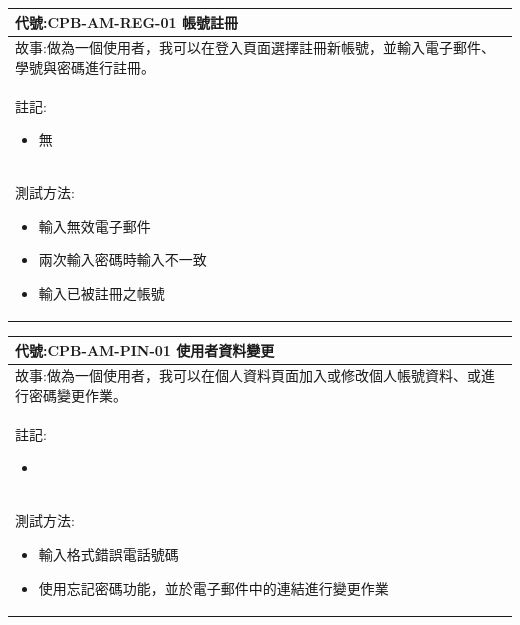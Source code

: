 \documentclass{article}
\begin{document}
\begin{table}[H]
	\begin{tabular}{| m{13cm} |}
		\hline
		代號:CPB-AM-REG-01	帳號註冊                         \\ \hline
		故事:做為一個使用者，我可以在登入頁面選擇註冊新帳號，並輸入電子郵件、學號與密碼進行註冊。 \\	\hline
		註記:
		\begin{itemize}
			\item 無
		\end{itemize}                                \\ \hline
		測試方法:
		\begin{itemize}
			\item 輸入無效電子郵件
			\item 兩次輸入密碼時輸入不一致
			\item 輸入已被註冊之帳號
		\end{itemize}
		\\	\hline
	\end{tabular}
\end{table}

\begin{table}[H]
	\begin{tabular}{| m{13cm} |}
		\hline
		代號:CPB-AM-PIN-01	使用者資料變更                    \\ \hline
		故事:做為一個使用者，我可以在個人資料頁面加入或修改個人帳號資料、或進行密碼變更作業。 \\	\hline
		註記:
		\begin{itemize}
			\item
		\end{itemize}                              \\ \hline
		測試方法:
		\begin{itemize}
			\item 輸入格式錯誤電話號碼
			\item 使用忘記密碼功能，並於電子郵件中的連結進行變更作業
		\end{itemize}
		\\	\hline
	\end{tabular}
\end{table}
\end{document}
